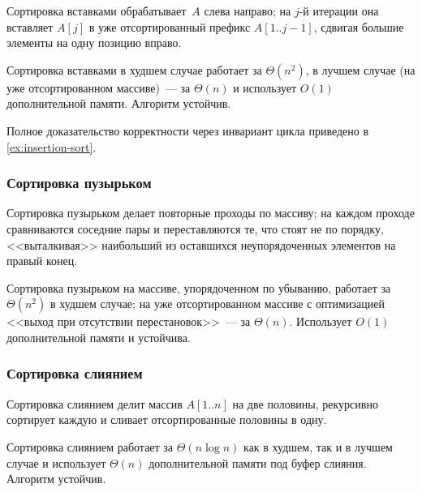 Сортировка вставками обрабатывает~$A$ слева направо; на $j$-й итерации
она вставляет $A[j]$ в уже отсортированный префикс $A[1..j-1]$,
сдвигая большие элементы на одну позицию вправо.

\begin{proposition}
\label{prop:insertion-sort}
Сортировка вставками в худшем случае работает за $\Theta(n^2)$, в
лучшем случае (на уже отсортированном массиве)~--- за $\Theta(n)$ и
использует $O(1)$ дополнительной памяти. Алгоритм устойчив.
\end{proposition}

Полное доказательство корректности через инвариант цикла приведено в
\cref{ex:insertion-sort}.

\subsubsection*{Сортировка пузырьком}

Сортировка пузырьком делает повторные проходы по массиву; на каждом
проходе сравниваются соседние пары и переставляются те, что стоят не
по порядку, <<выталкивая>> наибольший из оставшихся неупорядоченных
элементов на правый конец.

\begin{proposition}
\label{prop:bubble-sort}
Сортировка пузырьком на массиве, упорядоченном по убыванию, работает
за $\Theta(n^2)$ в худшем случае; на уже отсортированном массиве с
оптимизацией <<выход при отсутствии перестановок>>~--- за
$\Theta(n)$. Использует $O(1)$ дополнительной памяти и устойчива.
\end{proposition}

\subsubsection*{Сортировка слиянием}

Сортировка слиянием делит массив $A[1..n]$ на две половины, рекурсивно
сортирует каждую и сливает отсортированные половины в одну.

\begin{proposition}
\label{prop:merge-sort}
Сортировка слиянием работает за $\Theta(n \log n)$ как в худшем, так
и в лучшем случае и использует $\Theta(n)$ дополнительной памяти под
буфер слияния. Алгоритм устойчив.
\end{proposition}

